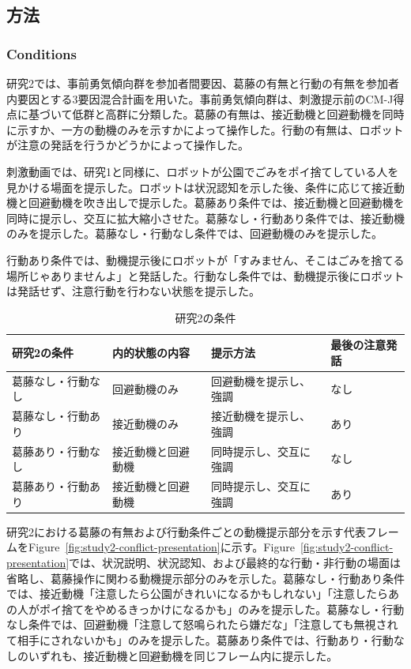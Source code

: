 \documentclass[utf8]{FrontiersinHarvard}
\begin{document}
\subsection{方法}

\subsubsection{Conditions}

研究2では、事前勇気傾向群を参加者間要因、葛藤の有無と行動の有無を参加者内要因とする3要因混合計画を用いた。事前勇気傾向群は、刺激提示前のCM-J得点に基づいて低群と高群に分類した。葛藤の有無は、接近動機と回避動機を同時に示すか、一方の動機のみを示すかによって操作した。行動の有無は、ロボットが注意の発話を行うかどうかによって操作した。

刺激動画では、研究1と同様に、ロボットが公園でごみをポイ捨てしている人を見かける場面を提示した。ロボットは状況認知を示した後、条件に応じて接近動機と回避動機を吹き出しで提示した。葛藤あり条件では、接近動機と回避動機を同時に提示し、交互に拡大縮小させた。葛藤なし・行動あり条件では、接近動機のみを提示した。葛藤なし・行動なし条件では、回避動機のみを提示した。

行動あり条件では、動機提示後にロボットが「すみません、そこはごみを捨てる場所じゃありませんよ」と発話した。行動なし条件では、動機提示後にロボットは発話せず、注意行動を行わない状態を提示した。

\begin{table}[htbp]
\centering
\small
\caption{研究2の条件}
\begin{tabularx}{\linewidth}{lXlX}
\toprule
研究2の条件 & 内的状態の内容 & 提示方法 & 最後の注意発話 \\
\midrule
葛藤なし・行動なし & 回避動機のみ & 回避動機を提示し、強調 & なし \\
葛藤なし・行動あり & 接近動機のみ & 接近動機を提示し、強調 & あり \\
葛藤あり・行動なし & 接近動機と回避動機 & 同時提示し、交互に強調 & なし \\
葛藤あり・行動あり & 接近動機と回避動機 & 同時提示し、交互に強調 & あり \\
\bottomrule
\end{tabularx}
\end{table}


研究2における葛藤の有無および行動条件ごとの動機提示部分を示す代表フレームをFigure~\ref{fig:study2-conflict-presentation}に示す。Figure~\ref{fig:study2-conflict-presentation}では、状況説明、状況認知、および最終的な行動・非行動の場面は省略し、葛藤操作に関わる動機提示部分のみを示した。葛藤なし・行動あり条件では、接近動機「注意したら公園がきれいになるかもしれない」「注意したらあの人がポイ捨てをやめるきっかけになるかも」のみを提示した。葛藤なし・行動なし条件では、回避動機「注意して怒鳴られたら嫌だな」「注意しても無視されて相手にされないかも」のみを提示した。葛藤あり条件では、行動あり・行動なしのいずれも、接近動機と回避動機を同じフレーム内に提示した。
\end{document}
